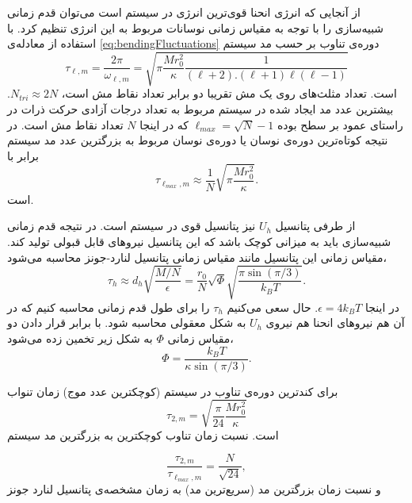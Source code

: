 از آنجایی که انرژی انحنا قوی‌ترین انرژی در سیستم است می‌توان قدم زمانی شبیه‌سازی را با توجه به مقیاس زمانی نوسانات مربوط به این انرژی تنظیم کرد. با استفاده از معادله‌ی 
\ref{eq:bendingFluctuations}
دوره‌ی تناوب بر حسب مد سیستم
\begin{equation}
\tau_{\ell,m}=\frac{2\pi}{\omega_{\ell,m}}=\sqrt{\pi \frac{Mr_0^2}{\kappa}\frac{1}{(\ell+2).(\ell+1)\ell(\ell-1)}}
\label{eq:Lperiod}
\end{equation}
است. تعداد مثلث‌های روی یک مش تقریبا دو برابر تعداد نقاط مش است،
$N_{tri}\approx 2N$.
بیشترین عدد مد ایجاد شده در سیستم مربوط به تعداد درجات آزادی حرکت ذرات در راستای عمود بر سطح بوده
$\ell_{max}=\sqrt{N}-1$ 
\cite{Gompper1996}
که در اینجا 
$N$
تعداد نقاط مش است. در نتیجه کوتاه‌ترین دوره‌ی نوسان یا دوره‌ی نوسان مربوط به بزرگترین عدد مد سیستم برابر با 
\begin{equation}
\tau_{\ell_{max},m}\approx \frac{1}{N}\sqrt{\pi \frac{Mr_0^2}{\kappa}}.
\label{eq:LmaxPeriod}
\end{equation}
است. 

از طرفی پتانسیل 
$U_h$
نیز پتانسیل قوی در سیستم است. در نتیجه قدم زمانی شبیه‌سازی باید به میزانی کوچک باشد که این پتانسیل نیروهای قابل قبولی تولید کند. مقیاس زمانی این پتانسیل مانند مقیاس زمانی پتانسیل لنارد-جونز محاسبه می‌شود،
\begin{equation}
\tau_{h}\approx d_h\sqrt{\frac{M/N}{\epsilon}}=\frac{r_0}{N}\sqrt{\Phi}\sqrt{\frac{\pi\sin(\pi/3)}{k_BT}}.
\label{eq:tauWCAh}
\end{equation}
در اینجا 
$\epsilon=4k_BT$.
حال سعی می‌کنیم 
$\tau_{h}$
را برای طول قدم زمانی محاسبه کنیم که در آن هم نیرو‌های انحنا هم نیروی 
$U_h$
به شکل معقولی محاسبه شود. با برابر قرار دادن دو مقیاس زمانی 
$\Phi$
به شکل زیر تخمین زده می‌شود،
\begin{equation}
\Phi=\frac{k_BT}{\kappa\sin(\pi/3)}.
\label{eq:phiTimeScale}
\end{equation}

برای کندترین دوره‌ی تناوب در سیستم 
(کوچکترین عدد موج)
زمان تنواب
\begin{equation}
\tau_{2,m}=\sqrt{\frac{\pi}{24} \frac{Mr_0^2}{\kappa}}
\label{eq:Lperiod}
\end{equation}
است. نسبت زمان تناوب کوچکترین به بزرگترین مد سیستم

\begin{equation}
\frac{\tau_{2,m}}{\tau_{\ell_{max},m}}=\frac{N}{\sqrt{24}},
\end{equation}
و نسبت زمان بزرگترین مد (سریع‌ترین مد) به زمان مشخصه‌ی پتانسیل لنارد جونز

